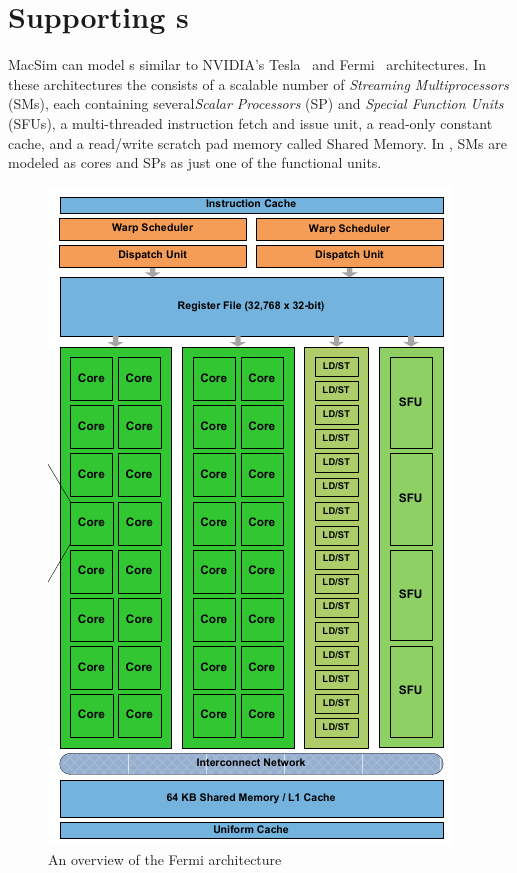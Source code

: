 \chapter{Supporting {\gpu}s}

MacSim can model {\gpu}s similar to NVIDIA's Tesla~\cite{lin:nic08} and
Fermi~\cite{fermi} architectures.  In these architectures the {\gpu} consists of a
scalable number of {\em Streaming Multiprocessors} (SMs), each containing
several{\em Scalar Processors} (SP) and {\em Special Function Units} (SFUs), a
multi-threaded instruction fetch and issue unit, a read-only constant cache, and
a read/write scratch pad memory called Shared Memory.  In \SIM, SMs are modeled
as cores and SPs as just one of the functional units. 


		\begin{figure}[htb]
		\centering
		\includegraphics[scale=0.5]{figs/fermi_arch.png}
		\caption{An overview of the Fermi {\gpu} architecture}
		\label{fig:g80}
		\end{figure}


